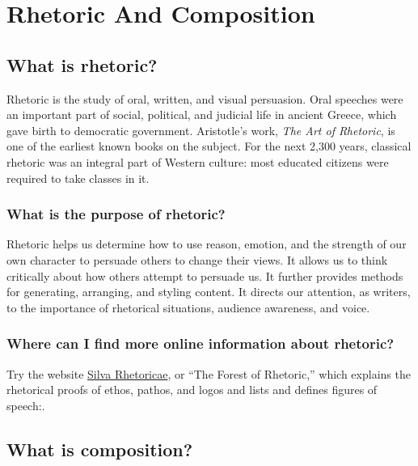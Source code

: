 
\chapter{Rhetoric And Composition}


\section{What is rhetoric?}

Rhetoric is the study of oral, written, and visual persuasion. Oral speeches were an 
important part of social, political, and judicial life in ancient Greece, which gave birth 
to democratic government. Aristotle's work, \emph{The Art of Rhetoric}, is one of the 
earliest known books on the subject. For the next 2,300 years, classical rhetoric was an 
integral part of Western culture: most educated citizens were required to take classes 
in it.

\subsection{What is the purpose of rhetoric?}

Rhetoric helps us determine how to use reason, emotion, and the strength of our own 
character to persuade others to change their views. It allows us to think critically about 
how others attempt to persuade us. It further provides methods for generating, 
arranging, and styling content. It directs our attention, as writers, to the importance 
of rhetorical situations, audience awareness, and voice.

\subsection{Where can I find more online information about rhetoric?}

Try the website \href{http://rhetoric.byu.edu} {Silva Rhetoricae}, or ``The Forest of 
Rhetoric,'' which explains the rhetorical proofs of ethos, pathos, and logos and lists and 
defines figures of speech:.


\section{What is composition?}

